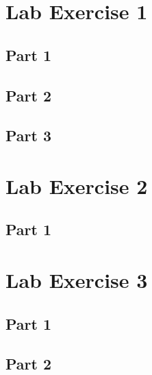 \begin{appendices}
	\label{Appendix:start}
	\section{Lab Exercise 1}
	{
		\subsection{Part 1}
			{
				\label{appendix:ex1-1}
				
			}
		\subsection{Part 2}
			{
				\label{appendix:ex1-2}
				
			}
		\subsection{Part 3}
			{
				\label{appendix:ex1-3}
				
			}
	}
	\section{Lab Exercise 2}
	{
		\subsection{Part 1}
			{
				\label{appendix:ex2-1}
				
			}
	}
	\section{Lab Exercise 3}
	{
		\subsection{Part 1}
			{
				\label{appendix:ex3-1}
				
			}
		\subsection{Part 2}
			{
				\label{appendix:ex3-2}
				
			}
	}

\end{appendices}